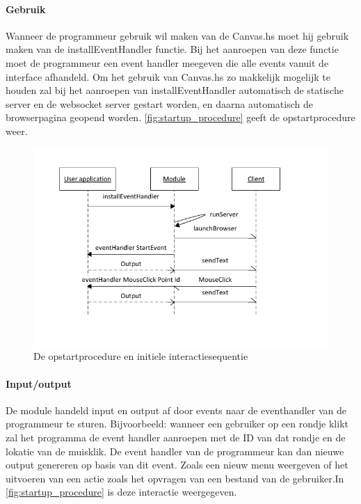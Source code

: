 \paragraph{Gebruik} Wanneer de programmeur gebruik wil maken van de Canvas.hs moet hij gebruik maken van de installEventHandler functie. Bij het aanroepen van deze functie moet de programmeur een event handler meegeven die alle events vanuit de interface afhandeld. Om het gebruik van Canvas.hs zo makkelijk mogelijk te houden zal bij het aanroepen van installEventHandler automatisch de statische server en de websocket server gestart worden, en daarna automatisch de browserpagina geopend worden. \autoref{fig:startup_procedure} geeft de opstartprocedure weer.

\begin{figure}
\begin{center}
\includegraphics[keepaspectratio,width=\textwidth]{./images/module_startup_procedure_interaction.pdf}
\caption{De opstartprocedure en initiele interactiesequentie}
\label{fig:startup_procedure}
\end{center}
\end{figure}

\paragraph{Input/output}
De module handeld input en output af door events naar de eventhandler van de programmeur te sturen. Bijvoorbeeld: wanneer een gebruiker op een rondje klikt zal het programma de event handler aanroepen met de ID van dat rondje en de lokatie van de muisklik. De event handler van de programmeur kan dan nieuwe output genereren op basis van dit event. Zoals een nieuw menu weergeven of het uitvoeren van een actie zoals het opvragen van een bestand van de gebruiker.In \autoref{fig:startup_procedure} is deze interactie weergegeven. 

